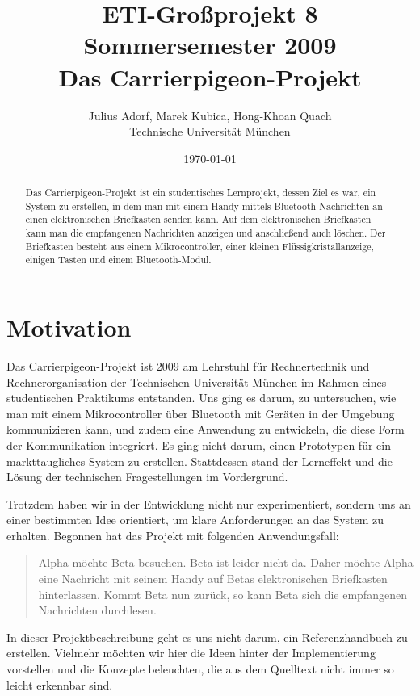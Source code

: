 \documentclass[ngerman]{article}
\author{Julius Adorf, Marek Kubica, Hong-Khoan Quach\\Technische Universität München}
\title{ETI-Großprojekt 8\\
       Sommersemester 2009\\
       {\bf Das Carrierpigeon-Projekt}
}
\date{\today}
\begin{document}
\maketitle

\begin{abstract}

Das Carrierpigeon-Projekt ist ein studentisches Lernprojekt, dessen Ziel es
war, ein System zu erstellen, in dem man mit einem Handy mittels Bluetooth
Nachrichten an einen elektronischen Briefkasten senden kann. Auf dem
elektronischen Briefkasten kann man die empfangenen Nachrichten anzeigen und
anschließend auch löschen. Der Briefkasten besteht aus einem Mikrocontroller,
einer kleinen Flüssig\-kristall\-an\-zeige, einigen Tasten und einem
Bluetooth-Modul.

\end{abstract}

\section{Motivation}

Das Carrierpigeon-Projekt ist 2009 am Lehrstuhl für Rechnertechnik und
Rechnerorganisation der Technischen Universität München im Rahmen eines
studentischen Praktikums entstanden. Uns ging es darum, zu untersuchen, wie man
mit einem Mikrocontroller über Bluetooth mit Geräten in der Umgebung
kommunizieren kann, und zudem eine Anwendung zu entwickeln, die diese Form der
Kommunikation integriert. Es ging nicht darum, einen Prototypen für ein
markttaugliches System zu erstellen. Stattdessen stand der Lerneffekt und die
Lösung der technischen Fragestellungen im Vordergrund.

Trotzdem haben wir in der Entwicklung nicht nur experimentiert, sondern uns an
einer bestimmten Idee orientiert, um klare Anforderungen an das System zu
erhalten. Begonnen hat das Projekt mit folgenden Anwendungsfall:

\begin{quote}

Alpha möchte Beta besuchen. Beta ist leider nicht da. Daher möchte Alpha eine
Nachricht mit seinem Handy auf Betas elektronischen Briefkasten hinterlassen.
Kommt Beta nun zurück, so kann Beta sich die empfangenen Nachrichten
durchlesen.

\end{quote}

In dieser Projektbeschreibung geht es uns nicht darum, ein Referenzhandbuch zu
erstellen. Vielmehr möchten wir hier die Ideen hinter der Implementierung
vorstellen und die Konzepte beleuchten, die aus dem Quelltext nicht immer so
leicht erkennbar sind.
\end{document}
